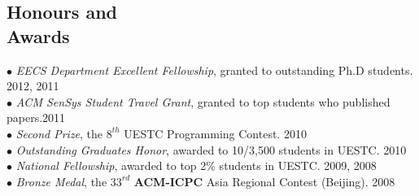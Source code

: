 \documentclass[margin, centered]{resume}
\begin{document}
\begin{resume}



    \section{\mysidestyle Honours and\\Awards} 

    $\bullet$ \textsl{EECS Department Excellent Fellowship}, granted to outstanding Ph.D students. \hfill 2012, 2011\vspace{0mm}\\%
    $\bullet$ \textsl{ACM SenSys Student Travel Grant}, granted to top students who published papers.\hfill 2011\vspace{0mm}\\%
    $\bullet$ \textsl{Second Prize}, the $8^{th}$ UESTC Programming Contest. \hfill 2010\vspace{0mm}\\%
    $\bullet$ \textsl{Outstanding Graduates Honor}, awarded to 10/3,500 students in UESTC. \hfill 2010\vspace{0mm}\\%
    $\bullet$ \textsl{National Fellowship}, awarded to top 2\% students in UESTC. \hfill 2009, 2008\vspace{0mm}\\%
    $\bullet$ \textsl{Bronze Medal}, the $33^{rd}$ \textbf{ACM-ICPC} Asia Regional Contest (Beijing). \hfill 2008\\ 


\end{resume}
\end{document}
